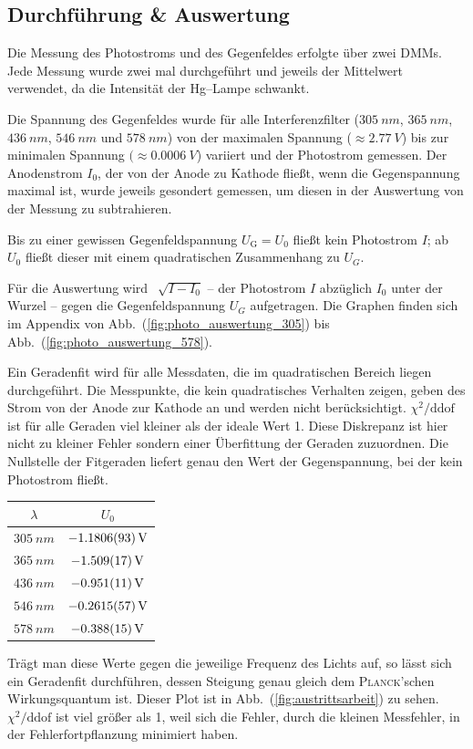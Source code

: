 \documentclass[sn-mathphys-num,iicol]{sn-jnl}
\theoremstyle{thmstyleone}
\theoremstyle{thmstyletwo}
\theoremstyle{thmstylethree}
\begin{document}
\subsection{Durchführung \& Auswertung}
Die Messung des Photostroms und des Gegenfeldes erfolgte über zwei DMMs.
Jede Messung wurde zwei mal durchgeführt und jeweils der Mittelwert verwendet, da die Intensität der Hg--Lampe schwankt.

Die Spannung des Gegenfeldes wurde für alle Interferenzfilter ($\SI{305}{nm}$, $\SI{365}{n m}$, $\SI{436}{n m}$, $\SI{546}{n m}$ und $\SI{578}{n m}$) von der maximalen Spannung ($\approx \SI{2.77}{V}$) bis zur minimalen Spannung $(\approx \SI{0.0006}{V}$) variiert und der Photostrom gemessen.
Der Anodenstrom $I_0$, der von der Anode zu Kathode fließt, wenn die Gegenspannung maximal ist, wurde jeweils gesondert gemessen, um diesen in der Auswertung von der Messung zu subtrahieren.

Bis zu einer gewissen Gegenfeldspannung $U_\text{G}=U_0$ fließt kein Photostrom $I$; ab $U_0$ fließt dieser mit einem quadratischen Zusammenhang zu $U_G$.

Für die Auswertung wird $\,\sqrt[]{I-I_0}$ -- der Photostrom $I$ abzüglich $I_0$ unter der Wurzel -- gegen die Gegenfeldspannung $U_G$ aufgetragen.
Die Graphen finden sich im Appendix von Abb.\ (\ref{fig:photo_auswertung_305}) bis Abb.\ (\ref{fig:photo_auswertung_578}).

Ein Geradenfit wird für alle Messdaten, die im quadratischen Bereich liegen durchgeführt.
Die Messpunkte, die kein quadratisches Verhalten zeigen, geben des Strom von der Anode zur Kathode an und werden nicht berücksichtigt.
$\chi ^2/\text{ddof}$ ist für alle Geraden viel kleiner als der ideale Wert 1.
Diese Diskrepanz ist hier nicht zu kleiner Fehler sondern einer Überfittung der Geraden zuzuordnen.
Die Nullstelle der Fitgeraden liefert genau den Wert der Gegenspannung, bei der kein Photostrom fließt.

\begin{table}[t]
        \begin{tabular}{cc}
                $\lambda $ & $U_0$ \\
                \hline
                $\SI{305}{n m}$ & $\SI{-1.1806+-0.0093}{V}$ \\
                $\SI{365}{n m}$ & $\SI{-1.509+-0.017}{V}$ \\
                $\SI{436}{n m}$ & $\SI{-0.951+-0.011}{V}$ \\
                $\SI{546}{n m}$ & $\SI{-0.2615+-0.0057}{V}$ \\
                $\SI{578}{n m}$ & $\SI{-0.388+-0.015}{V}$ 
        \end{tabular}
\end{table}
Trägt man diese Werte gegen die jeweilige Frequenz des Lichts auf, so lässt sich ein Geradenfit durchführen, dessen Steigung genau gleich dem \textsc{Planck}'schen Wirkungsquantum ist.
Dieser Plot ist in Abb.\ (\ref{fig:austrittsarbeit}) zu sehen.
$\chi ^2/\text{ddof}$ ist viel größer als 1, weil sich die Fehler, durch die kleinen Messfehler, in der Fehlerfortpflanzung minimiert haben.
\end{document}

